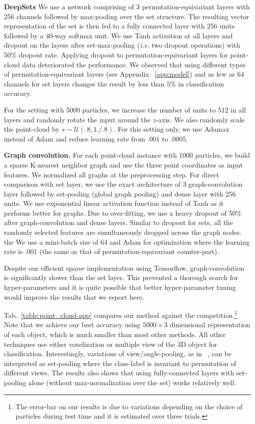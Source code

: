 \documentclass{article}
\newcommand{\refapp}[1]{Appendix ~\ref{#1}}
\newcommand{\reftab}[1]{Tab.~\ref{#1}}
\newcommand{\latinphrase}[1]{\emph{#1}}    %
\newcommand{\ie}{\latinphrase{i.e.}\xspace}
\newcommand{\deepsets}{DeepSets\xspace}
\begin{document}
\textbf{\deepsets}
We use a network comprising of 3 permutation-equivariant layers with 256 channels followed by max-pooling over the set structure. The resulting vector representation of the set is then fed to a fully connected layer with 256 units followed by a 40-way softmax unit. We use Tanh activation at all layers and dropout on the layers after set-max-pooling (\ie two dropout operations) with 50\% dropout rate. Applying dropout to permutation-equivariant layers for point-cloud data deteriorated the performance. We observed that using different types of permutation-equivariant layers (see \refapp{app:model}) and as few as 64 channels for set layers changes the result by less than $5\%$ in classification accuracy.

For the setting with 5000 particles, we increase the number of units to 512 in all layers and randomly rotate the input around the $z$-axis. We also randomly scale the point-cloud by $s \sim \mathcal{U}(.8,1./.8)$. For this setting only, we use Adamax~\cite{kingma2014adam} instead of Adam and reduce learning rate from $.001$ to $.0005$.

\textbf{Graph convolution.} For each point-cloud instance with 1000 particles, we build a sparse K-nearest neighbor graph and use the three point coordinates as input features. We normalized all graphs at the preprocessing step. For direct comparison with set layer, we use the exact architecture of 3 graph-convolution layer followed by set-pooling (global graph pooling) and dense layer with 256 units. We use exponential linear activation function instead of Tanh as it performs better for graphs. Due to over-fitting, we use a heavy dropout of 50\% after graph-convolution and dense layers. Similar to dropout for sets, all the randomly selected features are simultaneously dropped across the graph nodes. the  We use a mini-batch size of 64 and Adam for optimization where the learning rate is .001 (the same as that of permutation-equivariant counter-part).

Despite our efficient sparse implementation using Tensorflow, graph-convolution is significantly slower than the set layer. This prevented a thorough search for hyper-parameters and it is quite possible that better hyper-parameter tuning would improve the results that we report here.

\reftab{table:point_cloud-app} compares our method against the competition.\footnote{The error-bar on our results is due to variations depending on the choice of particles during test time and it is estimated over three trials.}  Note that we achieve our best accuracy using $5000\times3$ dimensional representation of each object, which is much smaller than most other methods. All other techniques use either voxelization or multiple view of the 3D object for classification. Interestingly, variations of view/angle-pooling, as in ~\cite{su2015multi,shi2015deeppano}, can be interpreted as set-pooling where the class-label is invariant to permutation of different views. The results also shows that using fully-connected layers with set-pooling alone (without max-normalization over the set) works relatively well.
\end{document}
